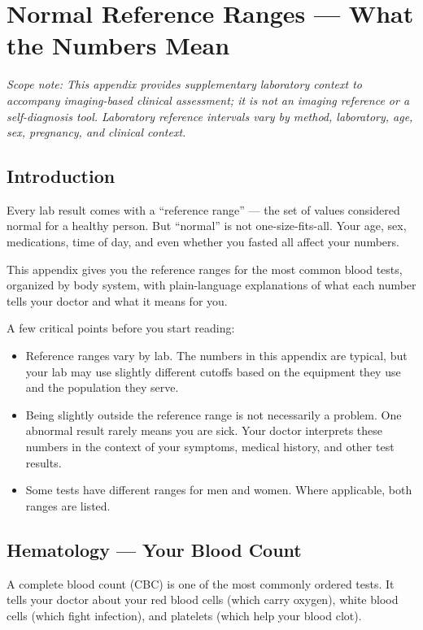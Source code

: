 \chapter{Normal Reference Ranges --- What the Numbers Mean}
\label{app:reference_ranges}

\textit{Scope note: This appendix provides supplementary laboratory context to accompany imaging-based clinical assessment; it is not an imaging reference or a self-diagnosis tool. Laboratory reference intervals vary by method, laboratory, age, sex, pregnancy, and clinical context.}

\clearpage
\section{Introduction}

Every lab result comes with a ``reference range'' --- the set of values considered normal for a healthy person. But ``normal'' is not one-size-fits-all. Your age, sex, medications, time of day, and even whether you fasted all affect your numbers.

This appendix gives you the reference ranges for the most common blood tests, organized by body system, with plain-language explanations of what each number tells your doctor and what it means for you.

A few critical points before you start reading:
\begin{itemize}
    \item Reference ranges vary by lab. The numbers in this appendix are typical, but your lab may use slightly different cutoffs based on the equipment they use and the population they serve.
    \item Being slightly outside the reference range is not necessarily a problem. One abnormal result rarely means you are sick. Your doctor interprets these numbers in the context of your symptoms, medical history, and other test results.
    \item Some tests have different ranges for men and women. Where applicable, both ranges are listed.
\end{itemize}

\clearpage
\section{Hematology --- Your Blood Count}

A complete blood count (CBC) is one of the most commonly ordered tests. It tells your doctor about your red blood cells (which carry oxygen), white blood cells (which fight infection), and platelets (which help your blood clot).

